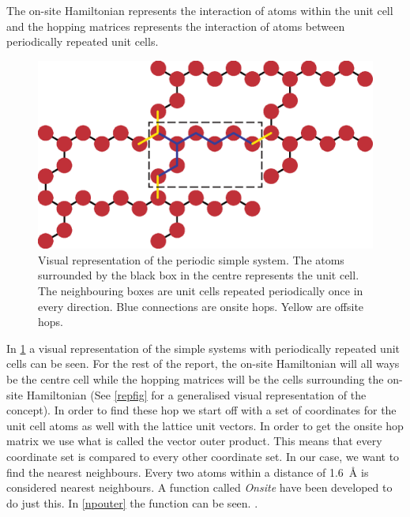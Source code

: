 The on-site Hamiltonian represents the interaction of atoms within the unit cell and the hopping matrices represents the interaction of atoms between periodically repeated unit cells.
\begin{figure}[ht]
 \centering
 \includegraphics[width=.7\textwidth]{Figures/atomreffig.eps}
 \caption{Visual representation of the periodic simple system. The atoms surrounded by the black box in the centre represents the unit cell. The neighbouring boxes are unit cells repeated periodically once in every direction. Blue connections are onsite hops. Yellow are offsite hops.}
 \label{atomrepfig}
\end{figure}
In \cref{atomrepfig} a visual representation of the simple systems with periodically repeated unit cells can be seen. For the rest of the report, the on-site Hamiltonian will all ways be the centre cell while the hopping matrices will be the cells surrounding the on-site Hamiltonian (See \cref{repfig} for a generalised visual representation of the concept).\newline
In order to find these hop we start off with a set of coordinates for the unit cell atoms as well with the lattice unit vectors. In order to get the onsite hop matrix we use what is called the vector outer product. This means that every coordinate set is compared to every other coordinate set. In our case, we want to find the nearest neighbours. Every two atoms within a distance of \SI{1.6}{\angstrom} is considered nearest neighbours. A function called \textit{Onsite} have been developed to do just this. In \cref{npouter} the function can be seen.
.
\vspace{-1\baselineskip}
\vspace{\baselineskip}
